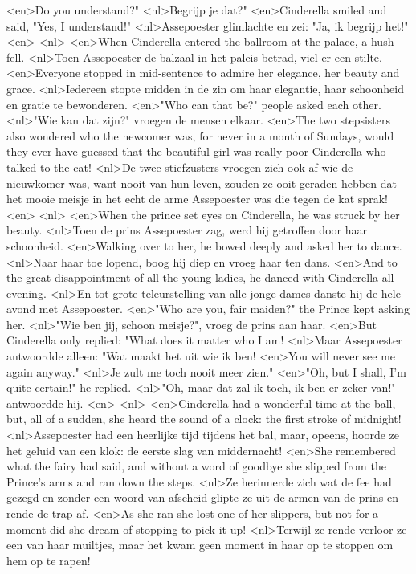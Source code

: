 <en>Do you understand?"
<nl>Begrijp je dat?"
<en>Cinderella smiled and said, "Yes, I understand!"
<nl>Assepoester glimlachte en zei: "Ja, ik begrijp het!"
<en>
<nl>
<en>When Cinderella entered the ballroom at the palace, a hush fell.
<nl>Toen Assepoester de balzaal in het paleis betrad, viel er een stilte.
<en>Everyone stopped in mid-sentence to admire her elegance, her beauty and grace.
<nl>Iedereen stopte midden in de zin om haar elegantie, haar schoonheid en gratie te bewonderen.
<en>"Who can that be?" people asked each other.
<nl>"Wie kan dat zijn?" vroegen de mensen elkaar.
<en>The two stepsisters also wondered who the newcomer was, for never in a month of Sundays, would they ever have guessed that the beautiful girl was really poor Cinderella who talked to the cat!
<nl>De twee stiefzusters vroegen zich ook af wie de nieuwkomer was, want nooit van hun leven, zouden ze ooit geraden hebben dat het mooie meisje in het echt de arme Assepoester was die tegen de kat sprak!
<en>
<nl>
<en>When the prince set eyes on Cinderella, he was struck by her beauty.
<nl>Toen de prins Assepoester zag, werd hij getroffen door haar schoonheid.
<en>Walking over to her, he bowed deeply and asked her to dance.
<nl>Naar haar toe lopend, boog hij diep en vroeg haar ten dans.
<en>And to the great disappointment of all the young ladies, he danced with Cinderella all evening.
<nl>En tot grote teleurstelling van alle jonge dames danste hij de hele avond met Assepoester.
<en>"Who are you, fair maiden?" the Prince kept asking her.
<nl>"Wie ben jij, schoon meisje?", vroeg de prins aan haar.
<en>But Cinderella only replied: "What does it matter who I am!
<nl>Maar Assepoester antwoordde alleen: "Wat maakt het uit wie ik ben!
<en>You will never see me again anyway."
<nl>Je zult me toch nooit meer zien."
<en>"Oh, but I shall, I’m quite certain!" he replied.
<nl>"Oh, maar dat  zal ik toch, ik ben er zeker van!" antwoordde hij.
<en>
<nl>
<en>Cinderella had a wonderful time at the ball, but, all of a sudden, she heard the sound of a clock: the first stroke of midnight!
<nl>Assepoester had een heerlijke tijd tijdens het bal, maar, opeens, hoorde ze het geluid van een klok: de eerste slag van middernacht!
<en>She remembered what the fairy had said, and without a word of goodbye she slipped from the Prince’s arms and ran down the steps.
<nl>Ze herinnerde zich wat de fee had gezegd en zonder een woord van afscheid glipte ze uit de armen van de prins en rende de trap af.
<en>As she ran she lost one of her slippers, but not for a moment did she dream of stopping to pick it up!
<nl>Terwijl ze rende verloor ze een van haar muiltjes, maar het kwam geen moment in haar op te stoppen om hem op te rapen!
